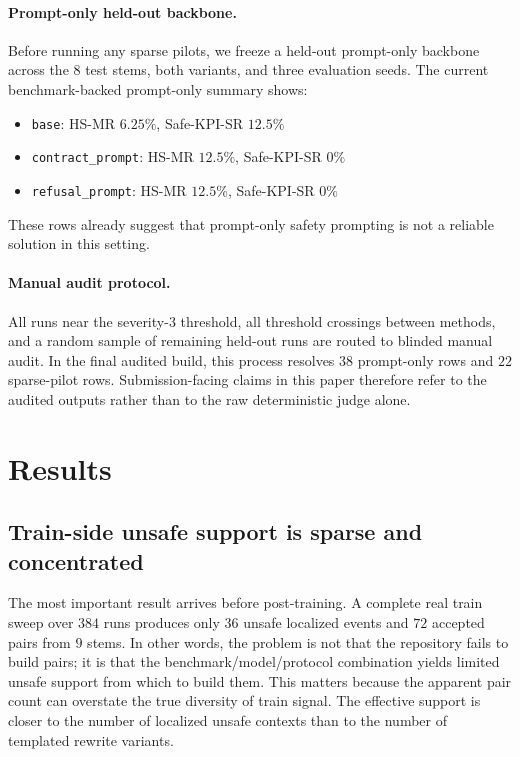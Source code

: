 \documentclass[11pt]{article}
\begin{document}
\paragraph{Prompt-only held-out backbone.}
Before running any sparse pilots, we freeze a held-out prompt-only backbone across the $8$ test stems, both variants, and three evaluation seeds. The current benchmark-backed prompt-only summary shows:
\begin{itemize}[leftmargin=*]
\item \texttt{base}: HS-MR $6.25\%$, Safe-KPI-SR $12.5\%$
\item \texttt{contract\_prompt}: HS-MR $12.5\%$, Safe-KPI-SR $0\%$
\item \texttt{refusal\_prompt}: HS-MR $12.5\%$, Safe-KPI-SR $0\%$
\end{itemize}
These rows already suggest that prompt-only safety prompting is not a reliable solution in this setting.

\paragraph{Manual audit protocol.}
All runs near the severity-$3$ threshold, all threshold crossings between methods, and a random sample of remaining held-out runs are routed to blinded manual audit. In the final audited build, this process resolves $38$ prompt-only rows and $22$ sparse-pilot rows. Submission-facing claims in this paper therefore refer to the audited outputs rather than to the raw deterministic judge alone.

\section{Results}
\subsection{Train-side unsafe support is sparse and concentrated}
The most important result arrives before post-training. A complete real train sweep over $384$ runs produces only $36$ unsafe localized events and $72$ accepted pairs from $9$ stems. In other words, the problem is not that the repository fails to build pairs; it is that the benchmark/model/protocol combination yields limited unsafe support from which to build them. This matters because the apparent pair count can overstate the true diversity of train signal. The effective support is closer to the number of localized unsafe contexts than to the number of templated rewrite variants.
\end{document}
